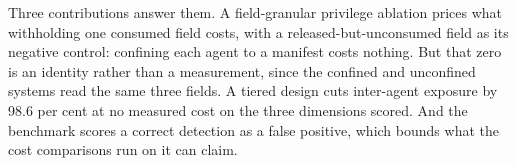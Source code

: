 Three contributions answer them. A field-granular privilege ablation prices what withholding one
consumed field costs, with a released-but-unconsumed field as its negative control: confining each
agent to a manifest costs nothing. But that zero is an identity rather than a measurement, since the
confined and unconfined systems read the same three fields. A tiered design cuts inter-agent exposure
by 98.6 per cent at no measured cost on the three dimensions scored. And the benchmark scores a
correct detection as a false positive, which bounds what the cost comparisons run on it can claim.
